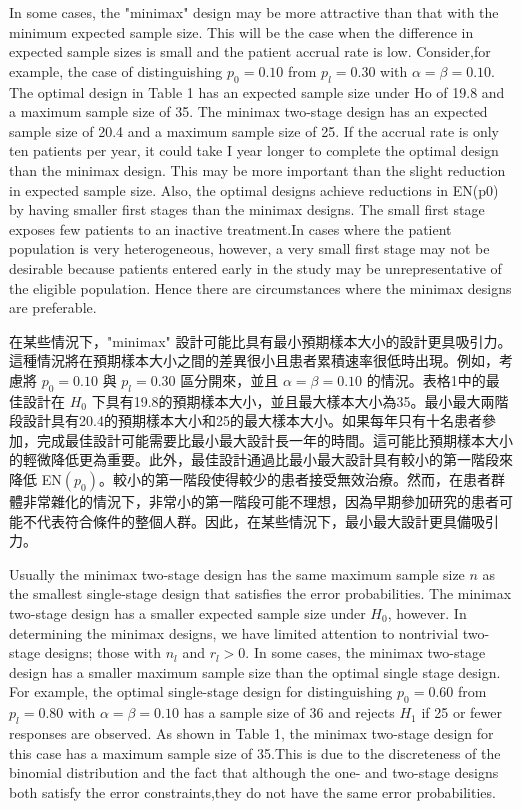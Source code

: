 	In some cases, the "minimax" design may be more attractive than that with the minimum expected sample size. This will be the case when the difference in expected sample sizes is small and the patient accrual rate is low. Consider,for example, the case of distinguishing $p_0 = 0.10 $ from $p_l = 0.30$ with $ \alpha = \beta  = 0.10$. The optimal design in Table 1 has an expected sample size under Ho of 19.8 and a maximum sample size of 35. The minimax two-stage design has an expected sample size of 20.4 and a maximum sample size of 25. If the accrual rate is only ten patients per year, it could take I year longer to complete the optimal design than the minimax design. This may be more important than the slight reduction in expected sample size. Also, the optimal designs achieve reductions in EN(p0) by having smaller first stages than the minimax designs. The small first stage exposes few patients to an inactive treatment.In cases where the patient population is very heterogeneous, however, a very small first stage may not be desirable because patients entered early in the study may be unrepresentative of the eligible population. Hence there are circumstances where the minimax designs are preferable. 

	在某些情況下，"minimax" 設計可能比具有最小預期樣本大小的設計更具吸引力。這種情況將在預期樣本大小之間的差異很小且患者累積速率很低時出現。例如，考慮將 $p_0 = 0.10 $ 與 $p_l = 0.30$ 區分開來，並且 $ \alpha = \beta  = 0.10$ 的情況。表格1中的最佳設計在 $H_0$ 下具有19.8的預期樣本大小，並且最大樣本大小為35。最小最大兩階段設計具有20.4的預期樣本大小和25的最大樣本大小。如果每年只有十名患者參加，完成最佳設計可能需要比最小最大設計長一年的時間。這可能比預期樣本大小的輕微降低更為重要。此外，最佳設計通過比最小最大設計具有較小的第一階段來降低 EN$(p_0)$。較小的第一階段使得較少的患者接受無效治療。然而，在患者群體非常雜化的情況下，非常小的第一階段可能不理想，因為早期參加研究的患者可能不代表符合條件的整個人群。因此，在某些情況下，最小最大設計更具備吸引力。

	Usually the minimax two-stage design has the same maximum sample size $n$ as the smallest single-stage design that satisfies the error probabilities. The minimax two-stage design has a smaller expected sample size under $H_0$, however. In determining the minimax designs, we have limited attention to nontrivial two-stage designs; those with $n_l$ and $r_l > 0$. In some cases, the minimax two-stage design has a smaller maximum sample size than the optimal single stage design. For example, the optimal single-stage design for distinguishing $p_0 = 0.60$ from $p_l = 0.80$ with $ \alpha = \beta = 0.10$ has a sample size of 36 and rejects $H_1$ if 25 or fewer responses are observed. As shown in Table 1, the minimax two-stage design for this case has a maximum sample size of 35.This is due to the discreteness of the binomial distribution and the fact that although the one- and two-stage designs both satisfy the error constraints,they do not have the same error probabilities. 

